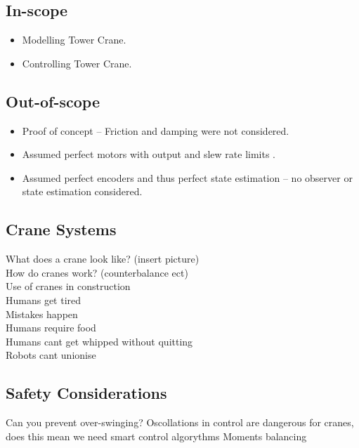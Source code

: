 \documentclass{UoNMCHA}
\numberwithin{equation}{section}
\begin{document}
	
	\subsection{In-scope} \label{In-scope}
	
	\begin{itemize}
		\item Modelling Tower Crane.
		\item Controlling Tower Crane.
	\end{itemize}
	
	\subsection{Out-of-scope} \label{Out-of-scope}
	
	\begin{itemize}
		\item Proof of concept – Friction and damping were not considered.
		\item Assumed perfect motors with output and slew rate limits .
		\item Assumed perfect encoders and thus perfect state estimation – no observer or state estimation considered.
		
	\end{itemize}
	
	\subsection{Crane Systems} \label{Crane Systems}
	
	What does a crane look like? (insert picture)\\
	How do cranes work? (counterbalance ect)\\
	Use of cranes in construction \\
	Humans get tired \\
	Mistakes happen\\
	Humans require food\\ 
	Humans cant get whipped without quitting\\
	Robots cant unionise \\
	
	\subsection{Safety Considerations} \label{Safety Considerations}
	
	Can you prevent over-swinging? Oscollations in control are dangerous for cranes, does this mean we need smart control algorythms
	Moments balancing 
	
\end{document}
